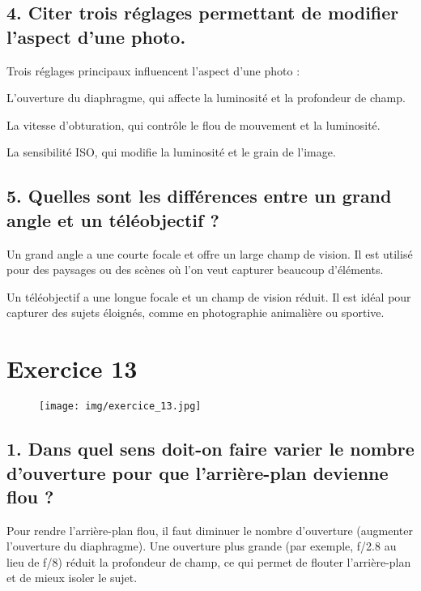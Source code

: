 \documentclass[answers]{exam}
\begin{document}
\subsection*{4. Citer trois réglages permettant de modifier l’aspect d’une photo.}

Trois réglages principaux influencent l’aspect d’une photo :
\begin{compactenum}
    \item L’ouverture du diaphragme, qui affecte la luminosité et la profondeur de champ.
    \item La vitesse d’obturation, qui contrôle le flou de mouvement et la luminosité.
    \item La sensibilité ISO, qui modifie la luminosité et le grain de l’image.
\end{compactenum}

\subsection*{5. Quelles sont les différences entre un grand angle et un téléobjectif ?}

\begin{compactenum}
    \item Un grand angle a une courte focale et offre un large champ de vision. Il est utilisé pour des paysages ou des scènes où l’on veut capturer beaucoup d’éléments.
    \item Un téléobjectif a une longue focale et un champ de vision réduit. Il est idéal pour capturer des sujets éloignés, comme en photographie animalière ou sportive.
\end{compactenum}


\section*{Exercice 13}

\begin{figure}[H]
  \centering
  \texttt{[image: img/exercice\_13.jpg]}
\end{figure}

\subsection*{1. Dans quel sens doit-on faire varier le nombre d'ouverture pour que l'arrière-plan devienne flou ?}

Pour rendre l'arrière-plan flou, il faut diminuer le nombre d'ouverture (augmenter l'ouverture du diaphragme). Une ouverture plus grande (par exemple, f/2.8 au lieu de f/8) réduit la profondeur de champ, ce qui permet de flouter l'arrière-plan et de mieux isoler le sujet.
\end{document}
